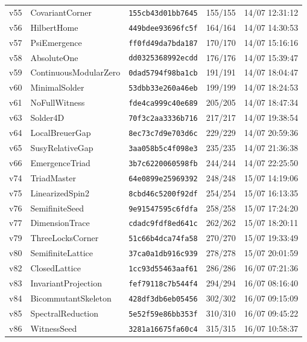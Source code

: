 \documentclass[11pt]{article}
\theoremstyle{definition}\newtheorem{deriv}{Derivação}
\begin{document}
{\begin{longtable}{@{}lllll@{}}
v55 & CovariantCorner & \texttt{155cb43d01bb7645} & 155/155 & 14/07 12:31:12 \\
v56 & HilbertHome & \texttt{449bdee93696fc5f} & 164/164 & 14/07 14:30:53 \\
v57 & PsiEmergence & \texttt{ff0fd49da7bda187} & 170/170 & 14/07 15:16:16 \\
v58 & AbsoluteOne & \texttt{dd0325368992ecdd} & 176/176 & 14/07 15:39:47 \\
v59 & ContinuousModularZero & \texttt{0dad5794f98ba1cb} & 191/191 & 14/07 18:04:47 \\
v60 & MinimalSolder & \texttt{53dbb33e260a46eb} & 199/199 & 14/07 18:24:53 \\
v61 & NoFullWitness & \texttt{fde4ca999c40e689} & 205/205 & 14/07 18:47:34 \\
v63 & Solder4D & \texttt{70f3c2aa3336b716} & 217/217 & 14/07 19:38:54 \\
v64 & LocalBreuerGap & \texttt{8ec73c7d9e703d6c} & 229/229 & 14/07 20:59:36 \\
v65 & SusyRelativeGap & \texttt{3aa058b5c4f098e3} & 235/235 & 14/07 21:36:38 \\
v66 & EmergenceTriad & \texttt{3b7c6220060598fb} & 244/244 & 14/07 22:25:50 \\
v74 & TriadMaster & \texttt{64e0899e25969392} & 248/248 & 15/07 14:19:06 \\
v75 & LinearizedSpin2 & \texttt{8cbd46c5200f92df} & 254/254 & 15/07 16:13:35 \\
v76 & SemifiniteSeed & \texttt{9e91547595c6fdfa} & 258/258 & 15/07 17:24:20 \\
v77 & DimensionTrace & \texttt{cdadc9fdf8ed641c} & 262/262 & 15/07 18:20:11 \\
v79 & ThreeLocksCorner & \texttt{51c66b4dca74fa58} & 270/270 & 15/07 19:33:49 \\
v80 & SemifiniteLattice & \texttt{37ca0a1db916c939} & 278/278 & 15/07 20:01:59 \\
v82 & ClosedLattice & \texttt{1cc93d55463aaf61} & 286/286 & 16/07 07:21:36 \\
v83 & InvariantProjection & \texttt{fef79118c7b544f4} & 294/294 & 16/07 08:16:40 \\
v84 & BicommutantSkeleton & \texttt{428df3db6eb05456} & 302/302 & 16/07 09:15:09 \\
v85 & SpectralReduction & \texttt{5e52f59e86bb353f} & 310/310 & 16/07 09:45:22 \\
v86 & WitnessSeed & \texttt{3281a16675fa60c4} & 315/315 & 16/07 10:58:37 \\

\end{longtable}}
\end{document}
